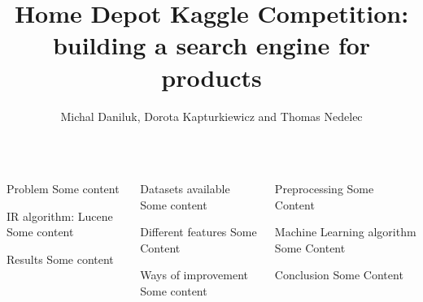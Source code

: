 \documentclass{beamer}
\title{Home Depot Kaggle Competition: building a search engine for products}
\author{Michal Daniluk, Dorota Kapturkiewicz and Thomas Nedelec}
\institute{%
  Department of Computing Science,
  University College London
}
\newlength\postercolumnwidth
\newlength\totalwidth
\begin{document}
\begin{frame}[t]{}
\centering
\begin{columns}[totalwidth=\totalwidth]
  \begin{column}[t]{\postercolumnwidth}
    \centering
    \begin{block}{Problem}
      Some content
    \end{block}
    \begin{block}{IR algorithm: Lucene}
      Some content
    \end{block}
\begin{block}{Results}
      Some content
    \end{block}
\end{column} 
    
  \begin{column}[t]{\postercolumnwidth}
    \centering
\begin{block}{Datasets available}
     Some content
    \end{block}
% 
 \begin{block}{Different features}
     Some Content
    \end{block}
  \begin{block}{Ways of improvement}
    Some content
    \end{block}
  \end{column}
  \begin{column}[t]{\postercolumnwidth}
    \centering
     \begin{block}{Preprocessing}
      Some Content
    \end{block}


    \begin{block}{Machine Learning algorithm}
      Some Content
    \end{block} 

    \begin{block}{Conclusion}
      Some Content
    \end{block}
  \end{column}
 \end{columns}

\end{frame}
\end{document}
